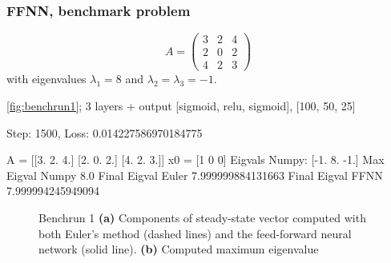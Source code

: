 \subsubsection{FFNN, benchmark problem}

\begin{equation*}
    A = \left(\begin{array}{ccc}
        3 & 2 & 4  \\
        2 & 0 & 2  \\
        4 & 2 & 3
    \end{array}\right)
\end{equation*}
with eigenvalues $\lambda_1 = 8$ and $\lambda_2 = \lambda_3 = -1$.



\autoref{fig:benchrun1}; 3 layers + output [sigmoid, relu, sigmoid], [100, 50, 25]

Step: 1500, Loss: 0.014227586970184775

A = [[3. 2. 4.]
 [2. 0. 2.]
 [4. 2. 3.]]
x0 = [1 0 0]
Eigvals Numpy: [-1.  8. -1.]
Max Eigval Numpy 8.0
Final Eigval Euler 7.999999884131663
Final Eigval FFNN 7.999994245949094

\begin{figure}[H]
\centering
{}
\qquad
{}
\caption{Benchrun 1 \textbf{(a)} Components of steady-state vector computed with both Euler's method (dashed lines) and the feed-forward neural network (solid line). \textbf{(b)} Computed maximum eigenvalue }
\label{fig:benchrun1}
\end{figure}

